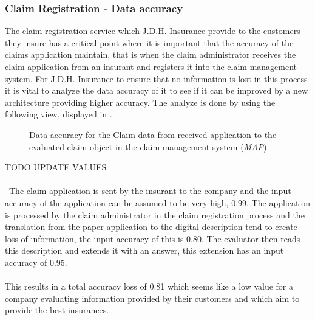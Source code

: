 \subsubsection{Claim Registration - Data accuracy}
\label{sec:claim_analysis}
The claim registration service which J.D.H. Insurance provide to the customers they insure has a critical point where it is important that the accuracy of the claims application maintain, that is when the claim administrator receives the claim application from an insurant and registers it into the claim management system. For J.D.H. Insurance to ensure that no information is lost in this process it is vital to analyze the data accuracy of it to see if it can be improved by a new architecture providing higher accuracy. The analyze is done by using the following view, displayed in .
\begin{center}
	\begin{figure}[H]
		\centering
		\setlength\fboxsep{7pt}
		\setlength\fboxrule{0.5pt}
		\caption{Data accuracy for the Claim data from received application to the evaluated claim object in the claim management system (\emph{MAP})}
		\label{fig:map_claim_data}
	\end{figure}
\end{center}
TODO UPDATE VALUES\\\\\
The claim application is sent by the insurant to the company and the input accuracy of the application can be assumed to be very high, 0.99. The application is processed by the claim administrator in the claim registration process and the translation from the paper application to the digital description tend to create loss of information, the input accuracy of this is 0.80. The evaluator then reads this description and extends it with an answer, this extension has an input accuracy of 0.95.\\\\
%
This results in a total accuracy loss of 0.81 which seems like a low value for a company evaluating information provided by their customers and which aim to provide the best insurances.

%
